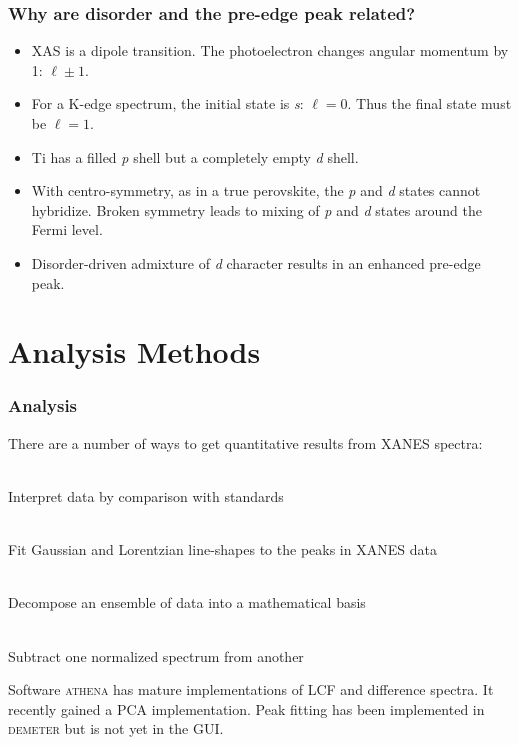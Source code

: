 \documentclass[10pt, xcolor=x11names, compress]{beamer}
\begin{document}
\begin{frame}
  \frametitle{Why are disorder and the pre-edge peak related?}

  \begin{itemize}
  \item XAS is a dipole transition.  The photoelectron changes angular
    momentum by 1: $\ell\pm1$.
  \item For a K-edge spectrum, the initial state is \textit{s}:
    $\ell=0$.  Thus  the final state must be $\ell=1$.
  \item Ti has a filled \textit{p} shell but a completely empty
    \textit{d} shell.
  \item With centro-symmetry, as in a true perovskite, the \textit{p}
    and \textit{d} states cannot hybridize.  Broken symmetry leads to
    mixing of \textit{p} and \textit{d} states around the Fermi level.
  \item Disorder-driven admixture of \textit{d} character results in
    an enhanced pre-edge peak.
  \end{itemize}

\end{frame}
\section[Analysis]{Analysis Methods}

\begin{frame}
  \frametitle{Analysis}

  There are a number of ways to get quantitative results from XANES
  spectra:
  \begin{description}[Linear]
  \item[Linear Combination Fitting] ~\\Interpret data by comparison with
    standards
  \item[Peak Fitting] ~\\Fit Gaussian and Lorentzian line-shapes to the
    peaks in XANES data
  \item[Principle Components Analysis] ~\\Decompose an ensemble of data
    into a mathematical basis
  \item[Difference Spectra] ~\\Subtract one normalized spectrum from
    another 
  \end{description}

  \begin{block}{Software}
    \textsc{athena} has mature implementations of LCF and difference
    spectra.  It recently gained a PCA implementation.  Peak fitting
    has been implemented in \textsc{demeter} but is not yet in  the GUI.\\
  \end{block}
\end{frame}
\end{document}
